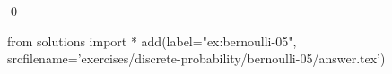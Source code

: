 
\begin{ex} 
  \label{ex:bernoulli-05}
  
  \qed
\end{ex} 
\begin{python0}
from solutions import *
add(label="ex:bernoulli-05",
    srcfilename='exercises/discrete-probability/bernoulli-05/answer.tex') 
\end{python0}
